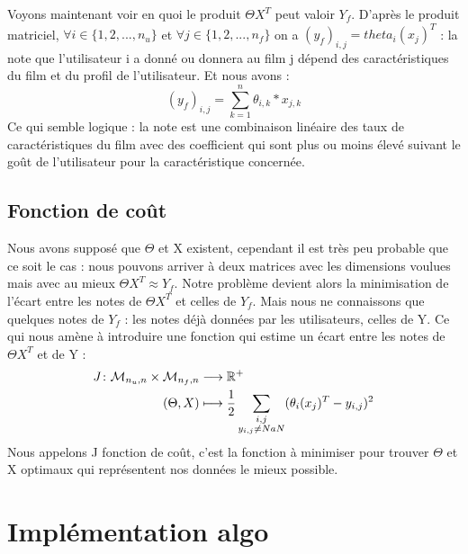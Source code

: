 \documentclass[a4paper,10pt]{article}
\begin{document}
Voyons maintenant voir en quoi le produit $\Theta X^T$ peut valoir $Y_f$. D'après le produit matriciel, $\forall i \in \{1, 2, ..., n_u\}$ et $\forall j \in \{1, 2, ..., n_f\}$ on a $(y_{f})_{i,j} = theta_{i}(x_{j})^{T}$ : la note que l'utilisateur i a donné ou donnera au film j dépend des caractéristiques du film et du profil de l'utilisateur. Et nous avons :
\[(y_{f})_{i,j} = \sum_{k = 1}^{n} \theta_{i,k} * x_{j,k}\]
Ce qui semble logique : la note est une combinaison linéaire des taux de caractéristiques du film avec des coefficient qui sont plus ou moins élevé suivant le goût de l'utilisateur pour la caractéristique concernée.

\subsection{Fonction de coût}

Nous avons supposé que $\Theta$ et X existent, cependant il est très peu probable que ce soit le cas : nous pouvons arriver à deux matrices avec les dimensions voulues mais avec au mieux $\Theta X^T \approx Y_f$. Notre problème devient alors la minimisation de l'écart entre les notes de $\Theta X^T$ et celles de $Y_f$. Mais nous ne connaissons que quelques notes de $Y_f$ : les notes déjà données par les utilisateurs, celles de Y. Ce qui nous amène à introduire une fonction qui estime un écart entre les notes de $\Theta X^T$ et de Y :
\begin{align*}
J\colon{\cal M}_{n_u, n} \times {\cal M}_{n_f, n} &\longrightarrow \mathbb{R}^+\\
(\Theta, X)&\longmapsto \frac{1}{2}\sum_{\substack{i,j \\ y_{i,j} \ne NaN}}(\theta_{i}(x_{j})^{T}-y_{i,j})^{2}
\end{align*}
Nous appelons J fonction de coût, c'est la fonction à minimiser pour trouver $\Theta$ et X optimaux qui représentent nos données le mieux possible.

\section{Implémentation algo}
\end{document}
